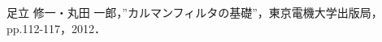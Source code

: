 \documentclass[a4paper,11pt]{jarticle}
\begin{document}






\begin{thebibliography}{99}
 足立 修一・丸田 一郎，”カルマンフィルタの基礎”，東京電機大学出版局，pp.112-117，2012．
\end{thebibliography}
\end{document}
